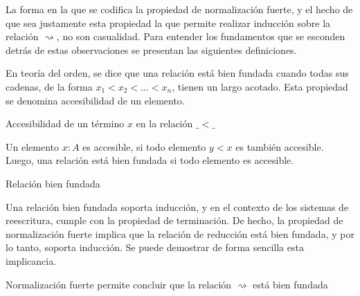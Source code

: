 La forma en la que se codifica la propiedad de normalización fuerte, y el hecho de que sea justamente esta propiedad la que permite realizar inducción sobre la relación $\rightsquigarrow$, no son casualidad.
Para entender los fundamentos que se esconden detrás de estas observaciones se presentan las siguientes definiciones.

En teoría del orden, se dice que una relación está bien fundada cuando todas sus cadenas, de la forma $x_1 < x_2 < \dots < x_n$, tienen un largo acotado.
Esta propiedad se denomina accesibilidad de un elemento.

\begin{codigo}
	Accesibilidad de un término $x$ en la relación $\_<\_$
\end{codigo}

Un elemento $x: A$ es accesible, si todo elemento $y < x$ es también accesible.
Luego, una relación está bien fundada si todo elemento es accesible.

\begin{codigo}
	Relación bien fundada
\end{codigo}

Una relación bien fundada soporta inducción, y en el contexto de los sistemas de reescritura, cumple con la propiedad de terminación.
De hecho, la propiedad de normalización fuerte implica que la relación de reducción está bien fundada, y por lo tanto, soporta inducción.
Se puede demostrar de forma sencilla esta implicancia.

\begin{codigo}
	Normalización fuerte permite concluir que la relación $\rightsquigarrow$ está bien fundada
\end{codigo} 
